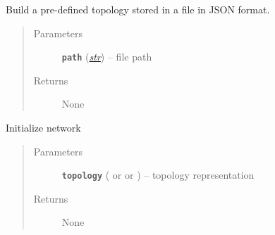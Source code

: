 \documentclass[letterpaper,10pt,english]{sphinxmanual}
\begin{document}
\begin{fulllineitems}
\begin{fulllineitems}
\end{fulllineitems}


\begin{fulllineitems}
\label{infr/topology:escape.infr.topology.ESCAPENetworkBuilder._ESCAPENetworkBuilder__init_from_file}
Build a pre-defined topology stored in a file in JSON format.
\begin{quote}\begin{description}
\item[{Parameters}] \leavevmode
\textbf{\texttt{path}} (\href{https://docs.python.org/2.7/library/functions.html\#str}{\emph{str}}) -- file path

\item[{Returns}] \leavevmode
None

\end{description}\end{quote}

\end{fulllineitems}


\begin{fulllineitems}
\label{infr/topology:escape.infr.topology.ESCAPENetworkBuilder.build}
Initialize network
\begin{quote}\begin{description}
\item[{Parameters}] \leavevmode
\textbf{\texttt{topology}} ({\hyperref[util/nffg:escape.util.nffg.NFFG]{\emph{}}} or \href{https://docs.python.org/2.7/reference/expressions.html\#dict}{} or {\hyperref[infr/topology:escape.infr.topology.AbstractTopology]{\emph{}}}) -- topology representation

\item[{Returns}] \leavevmode
None

\end{description}\end{quote}

\end{fulllineitems}


\end{fulllineitems}
\end{document}
